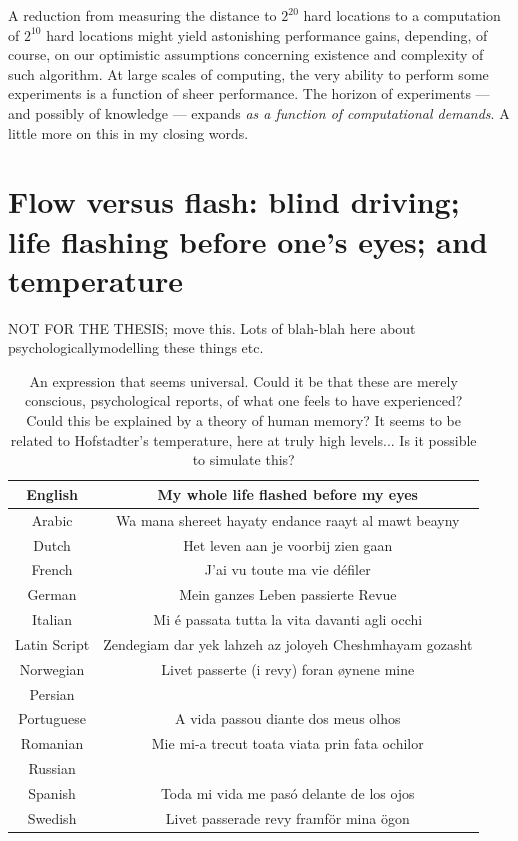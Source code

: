 A reduction from measuring the distance to $2^{20}$ hard locations to a computation of $2^{10}$ hard locations might yield astonishing performance gains, depending, of course, on our optimistic assumptions concerning existence and complexity of such algorithm.  At large scales of computing, the very ability to perform some experiments is a function of sheer performance. The horizon of experiments --- and possibly of knowledge --- expands \emph{as a function of computational demands}. A little more on this in my closing words.













\section{Flow versus flash:  blind driving; life flashing before one's eyes; and temperature}

NOT FOR THE THESIS; move this.  Lots of blah-blah here about psychologicallymodelling these things etc.

\begin{table}
\begin{tabular}{|c|c|}
\hline
English & My whole life flashed before my eyes\tabularnewline
\hline
\hline
Arabic & Wa mana shereet hayaty endance raayt al mawt beayny\tabularnewline
\hline
Dutch & Het leven aan je voorbij zien gaan\tabularnewline
\hline
French & J'ai vu toute ma vie défiler\tabularnewline
\hline
German & Mein ganzes Leben passierte Revue\tabularnewline
\hline
Italian & Mi é passata tutta la vita davanti agli occhi\tabularnewline
\hline
Latin Script & Zendegiam dar yek lahzeh az joloyeh Cheshmhayam gozasht\tabularnewline
\hline
Norwegian & Livet passerte (i revy) foran øynene mine\tabularnewline
\hline
Persian & \tabularnewline
\hline
Portuguese & A vida passou diante dos meus olhos\tabularnewline
\hline
Romanian & Mie mi-a trecut toata viata prin fata ochilor\tabularnewline
\hline
Russian & \tabularnewline
\hline
Spanish & Toda mi vida me pasó delante de los ojos\tabularnewline
\hline
Swedish & Livet passerade revy framför mina ögon\tabularnewline
\hline
\end{tabular}\caption{An expression that seems universal. Could it be that these are merely
conscious, psychological reports, of what one feels to have experienced?
Could this be explained by a theory of human memory?  It seems to be related to Hofstadter's temperature, here at truly high levels... Is it possible to simulate this?}
\end{table}\label{table:lflashing}

